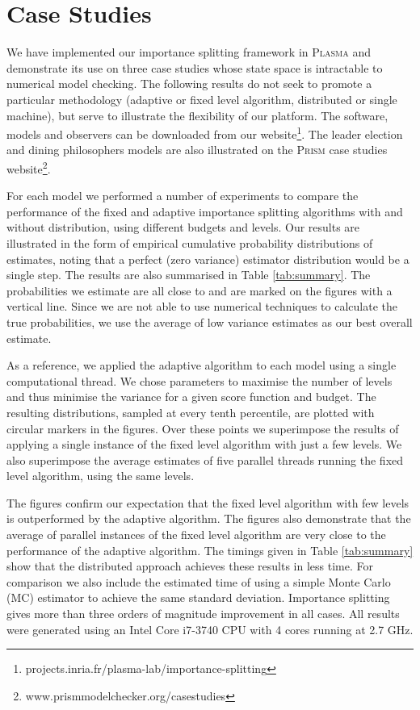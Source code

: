 \documentclass{llncs}
\begin{document}
\vspace{-1em}



\section{Case Studies\label{sec:examples}}

We have implemented our importance splitting framework in \textsc{Plasma}
\cite{BoyerCorreLegaySedwards2013} and demonstrate its use on three
case studies whose state space is intractable to numerical model checking.
The following results do not seek to promote a particular methodology
(adaptive or fixed level algorithm, distributed or single machine),
but serve to illustrate the flexibility of our platform. The software,
models and observers can be downloaded from our website\textsc{}\footnote{projects.inria.fr/plasma-lab/importance-splitting\label{fn:webpage}}.
The leader election and dining philosophers models are also illustrated
on the \textsc{Prism} case studies website\footnote{www.prismmodelchecker.org/casestudies\label{fn:prism}}.

For each model we performed a number of experiments to compare the
performance of the fixed and adaptive importance splitting algorithms
with and without distribution, using different budgets and levels.
Our results are illustrated in the form of empirical cumulative probability
distributions of  estimates, noting that a perfect (zero variance)
estimator distribution would be a single step. The results are also
summarised in Table \ref{tab:summary}. The probabilities we estimate
are all close to  and are marked on the figures with a vertical
line. Since we are not able to use numerical techniques to calculate
the true probabilities, we use the average of  low variance
estimates as our best overall estimate.

As a reference, we applied the adaptive algorithm to each model using
a single computational thread. We chose parameters to maximise the
number of levels and thus minimise the variance for a given score
function and budget. The resulting distributions, sampled at every
tenth percentile, are plotted with circular markers in the figures.
Over these points we superimpose the results of applying a single
instance of the fixed level algorithm with just a few levels. We also
superimpose the average estimates of five parallel threads running
the fixed level algorithm, using the same levels.

The figures confirm our expectation that the fixed level algorithm
with few levels is outperformed by the adaptive algorithm. The figures
also demonstrate that the average of parallel instances of the fixed
level algorithm are very close to the performance of the adaptive
algorithm. The timings given in Table \ref{tab:summary} show that
the distributed approach achieves these results in less time. For
comparison we also include the estimated time of using a simple Monte
Carlo (MC) estimator to achieve the same standard deviation. Importance
splitting gives more than three orders of magnitude improvement in
all cases. All results were generated using an Intel Core i7-3740
CPU with 4 cores running at 2.7 GHz.
\end{document}
